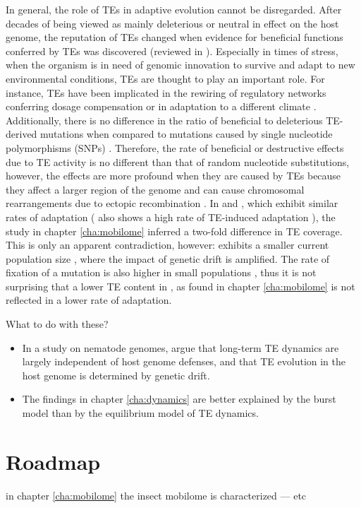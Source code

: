 In general, the role of TEs in adaptive evolution cannot be disregarded.
After decades of being viewed as mainly deleterious or neutral in effect
on the host genome, the reputation of TEs changed when evidence for
beneficial functions conferred by TEs was discovered (reviewed in
\citet{Oliver2012, Fedoroff2013}). Especially in times of stress, when
the organism is in need of genomic innovation to survive and adapt to
new environmental conditions, TEs are thought to play an important role.
For instance, TEs have been implicated in the rewiring of regulatory
networks conferring dosage compensation \citep{Ellison2013, Chuong2017}
or in adaptation to a different climate \citep{Gonzalez2010}.
Additionally, there is no difference in the ratio of beneficial to
deleterious TE-derived mutations when compared to mutations caused by
single nucleotide polymorphisms (SNPs) \citep{Akagi2013, Barron2014}.
Therefore, the rate of beneficial or destructive effects due to TE
activity is no different than that of random nucleotide substitutions,
however, the effects are more profound when they are caused by TEs
because they affect a larger region of the genome and can cause
chromosomal rearrangements due to ectopic recombination
\citep{Gray2000}. In  and , which exhibit similar rates of adaptation \citep{Bachtrog2008}
( also shows a high rate of TE-induced
adaptation \citep{Gonzalez2008}), the study in chapter
\ref{cha:mobilome} inferred a two-fold difference in TE coverage. This
is only an apparent contradiction, however: 
exhibits a smaller current population size \citep{Bachtrog2008}, where
the impact of genetic drift is amplified. The rate of fixation of a
mutation is also higher in small populations \citep{Kimura1969}, thus it
is not surprising that a lower TE content in , as
found in chapter \ref{cha:mobilome} is not reflected in a lower rate of
adaptation.

What to do with these?

\begin{itemize}
\item In a study on nematode genomes, \citet{Szitenberg2016} argue that
long-term TE dynamics are largely independent of host genome defenses,
and that TE evolution in the host genome is determined by genetic drift.

\item The findings in chapter \ref{cha:dynamics} are better explained by the
burst model than by the equilibrium model of TE dynamics. 
\end{itemize}

\section{Roadmap}

 in chapter
\ref{cha:mobilome} the insect mobilome is characterized --- etc
